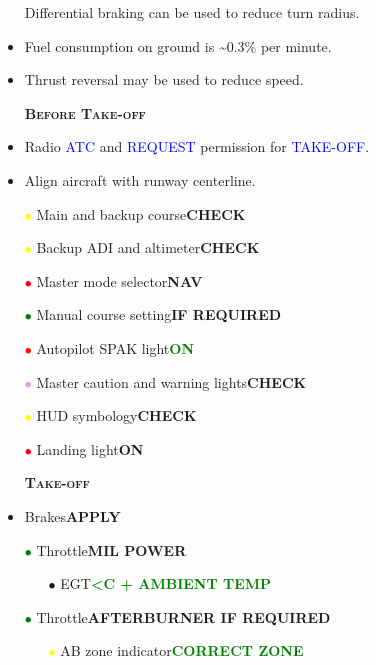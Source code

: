 \documentclass[a4paper,12pt,dvipsnames]{letter}
\newcommand{\radio}[1]{\textcolor{blue}{#1}}
\newcommand{\button}[1]{\textbf{#1}}
\newcommand{\degC}{\textdegree{}C}
\newcommand{\ok}[1]{\textcolor{Green}{\textbf{#1}}}
\newcommand{\myHead}[1]{{\LARGE\textsc{\textbf{#1}}}}
\newcommand{\bi}{\textcolor{ProcessBlue}{$\bullet$\;}}
\newcommand{\ri}{\textcolor{red}{$\bullet$\;}}
\newcommand{\gi}{\textcolor{Green}{$\bullet$\;}}
\newcommand{\yi}{\textcolor{Yellow}{$\bullet$\;}}
\newcommand{\vi}{\textcolor{Plum}{$\bullet$\;}}
\begin{document}
{\begin{itemize}
 \item[] Differential braking can be used to reduce turn radius.
 \item Fuel consumption on ground is \textasciitilde 0.3\% per minute.
 \item Thrust reversal may be used to reduce speed.
\end{itemize}
\newpage
\begin{itemize}
 \item[] \myHead{Before Take-off}
 \item Radio \radio{ATC} and \radio{REQUEST} permission for \radio{TAKE-OFF}.
 \item Align aircraft with runway centerline.
 \item[\yi] Main and backup course\dotfill\button{CHECK}
 \item[\yi] Backup ADI and altimeter\dotfill\button{CHECK}
 \item[\ri] Master mode selector\dotfill\button{NAV}
 \item[\gi] Manual course setting\dotfill\button{IF REQUIRED}
 \item[\ri] Autopilot SPAK light\dotfill\ok{ON}
 \item[\vi] Master caution and warning lights\dotfill\button{CHECK}
 \item[\yi] HUD symbology\dotfill\button{CHECK}
 \item[\ri] Landing light\dotfill\button{ON}
\end{itemize}
\begin{itemize}
 \item [] \myHead{Take-off}
 \item Brakes\dotfill\button{APPLY}
 \item[\gi] Throttle\dotfill\button{MIL POWER}
 \begin{itemize}
  \item[\bi] EGT\dotfill\ok{<\degC{} + AMBIENT TEMP}
 \end{itemize}
 \item[\gi] Throttle\dotfill\button{AFTERBURNER IF REQUIRED}
 \begin{itemize}
  \item[\yi] AB zone indicator\dotfill\ok{CORRECT ZONE}

\end{itemize}
\end{itemize}}
\end{document}
